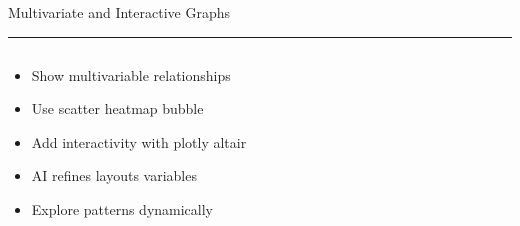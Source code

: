 \documentclass[aspectratio=169]{beamer}
\newcommand{\TitleFont}{\rmfamily}
\begin{document}
\begin{frame}[t]{}
  \vspace*{0.5cm}
  {\TitleFont\fontsize{18}{22}\selectfont\color{LUBronze}Multivariate and Interactive Graphs\par}
  \vspace{0.3em}
  {\color{LUBronze}\rule{\linewidth}{0.8pt}}\par
  \vspace{0.2cm}
  \begin{columns}[t]
    \begin{column}[t]{0.4\textwidth}
      \vspace*{0pt}
      \begin{itemize}\setlength\itemsep{0.65em}
        \item Show multivariable relationships
        \item Use scatter heatmap bubble
        \item Add interactivity with plotly altair
        \item AI refines layouts variables
        \item Explore patterns dynamically
      \end{itemize}
    \end{column}
  \end{columns}
\end{frame}
\end{document}
